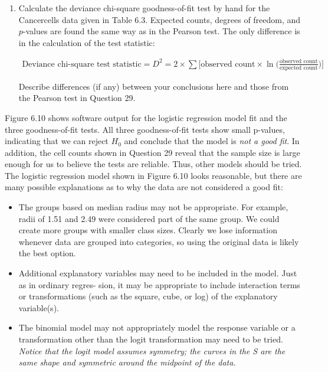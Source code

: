 \documentclass[
]{report}
\begin{document}
\begin{enumerate}
\item Calculate the deviance chi-square goodness-of-fit test by hand for the Cancercells data given in Table 6.3. Expected counts, degrees of freedom, and $\scriptstyle p$-values are found the same way as in the Pearson test. The only difference is in the calculation of the test statistic:

   \begin{align}
   \text{Deviance chi-square test statistic} = D^2 = 2 \times \sum \biggl[\text{observed count} \times \ln\bigl(\frac{\text{observed count}}{\text{expected count}}\bigr)\biggr]
   \tag{6.26}
   \end{align}
   
   Describe differences (if any) between your conclusions here and those from the Pearson test in Question 29.

 \end{enumerate}

Figure 6.10 shows software output for the logistic regression model fit and the three goodness-of-fit tests. All three goodness-of-fit tests show small p-values, indicating that we can reject \(\scriptstyle H_0\) and conclude that the model is \emph{not a good fit}. In addition, the cell counts shown in Question 29 reveal that the sample size is large enough for us to believe the tests are reliable. Thus, other models should be tried. The logistic regression model shown in Figure 6.10 looks reasonable, but there are many possible explanations as to why
the data are not considered a good fit:

\begin{itemize}
\item
  The groups based on median radius may not be appropriate. For example, radii of 1.51 and 2.49 were considered part of the same group. We could create more groups with smaller class sizes. Clearly we lose information whenever data are grouped into categories, so using the original data is likely the best option.
\item
  Additional explanatory variables may need to be included in the model. Just as in ordinary regres-
  sion, it may be appropriate to include interaction terms or transformations (such as the square, cube,
  or log) of the explanatory variable(s).
\item
  The binomial model may not appropriately model the response variable or a transformation other
  than the logit transformation may need to be tried. \emph{Notice that the logit model assumes symmetry; the curves in the S are the same shape and symmetric around the midpoint of the data.}
\end{itemize}
\end{document}
